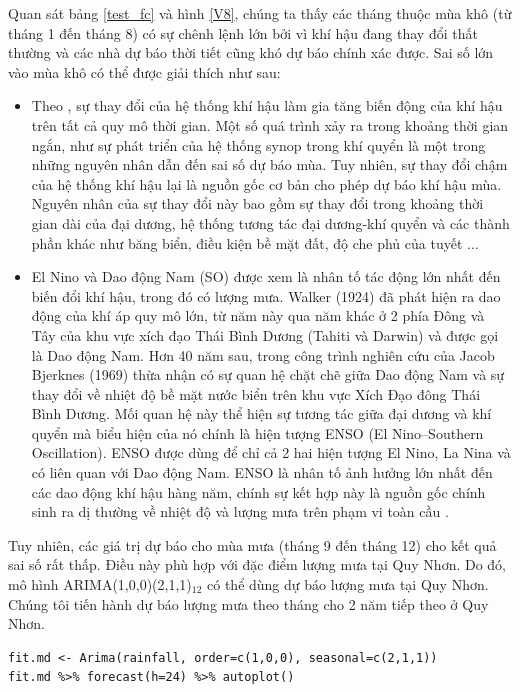 \documentclass[12pt, a4paper,oneside]{book}
\theoremstyle{definition}
\begin{document}
Quan sát bảng \ref{test_fc} và hình \ref{V8}, chúng ta thấy các tháng thuộc mùa khô (từ tháng 1 đến tháng 8) có sự chênh lệnh lớn bởi vì khí hậu đang thay đổi thất thường và các nhà dự báo thời tiết cũng khó dự báo chính xác được. Sai số lớn vào mùa khô có thể được giải thích như sau:
\begin{itemize}
	\item Theo \cite{23}, sự thay đổi của hệ thống khí hậu làm gia tăng biến động của khí hậu trên tất cả quy mô thời gian. Một số quá trình xảy ra trong khoảng thời gian ngắn, như sự phát triển của hệ thống synop trong khí quyển là một trong những nguyên nhân dẫn đến sai số dự báo mùa. Tuy nhiên, sự thay đổi chậm của hệ thống khí hậu lại là nguồn gốc cơ bản cho phép dự báo khí hậu mùa. Nguyên nhân của sự thay đổi này bao gồm sự thay đổi trong khoảng thời gian dài của đại dương, hệ thống tương tác đại dương-khí quyển và các thành phần khác như băng biển, điều kiện bề mặt đất, độ che phủ của tuyết ...
	\item El Nino và Dao động Nam (SO) được xem là nhân tố tác động lớn nhất đến biến đổi khí hậu, trong đó có lượng mưa. Walker (1924) đã phát hiện ra dao động của khí áp quy mô lớn, từ năm này qua năm khác ở 2 phía Đông và Tây của khu vực xích đạo Thái Bình Dương (Tahiti và Darwin) và được gọi là Dao động Nam. Hơn 40 năm sau, trong công trình nghiên cứu của Jacob Bjerknes (1969) thừa nhận có sự quan hệ chặt chẽ giữa Dao động Nam và sự thay đổi về nhiệt độ bề mặt nước biển trên khu vực Xích Đạo đông Thái Bình Dương. Mối quan hệ này thể hiện sự tương tác giữa đại dương và khí quyển mà biểu hiện của nó chính là hiện tượng ENSO (El Nino–Southern Oscillation). ENSO được dùng để chỉ cả 2 hai hiện tượng El Nino, La Nina và có liên quan với Dao động Nam. ENSO là nhân tố ảnh hưởng lớn nhất đến các dao động khí hậu hàng năm, chính sự kết hợp này là nguồn gốc chính sinh ra dị thường về nhiệt độ và lượng mưa trên phạm vi toàn cầu \cite{24}.
\end{itemize}
Tuy nhiên, các giá trị dự báo cho mùa mưa (tháng 9 đến tháng 12) cho kết quả sai số rất thấp. Điều này phù hợp với đặc điểm lượng mưa tại Quy Nhơn. Do đó, mô hình ARIMA(1,0,0)(2,1,1)$_{12}$ có thể dùng dự báo lượng mưa tại Quy Nhơn. Chúng tôi tiến hành dự báo lượng mưa theo tháng cho 2 năm tiếp theo ở Quy Nhơn.
\begin{lstlisting}
fit.md <- Arima(rainfall, order=c(1,0,0), seasonal=c(2,1,1))
fit.md %>% forecast(h=24) %>% autoplot()
\end{lstlisting}
\end{document}
